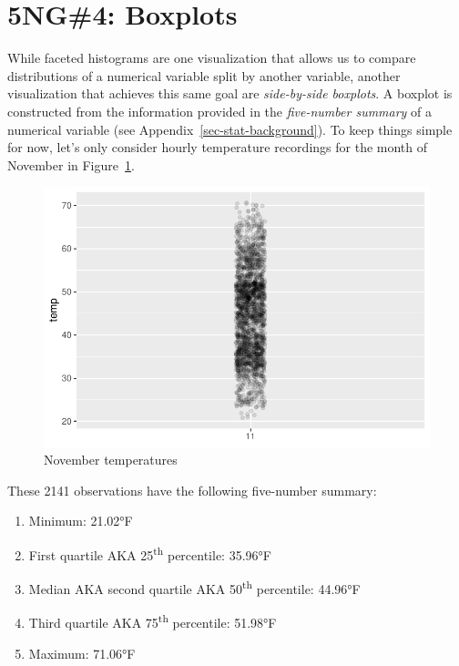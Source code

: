 \documentclass[
  letterpaper,
  DIV=11,
  numbers=noendperiod]{scrreprt}
\providecommand{\tightlist}{%
  \setlength{\itemsep}{0pt}\setlength{\parskip}{0pt}}\usepackage{longtable,booktabs,array}
\theoremstyle{definition}
\theoremstyle{remark}
\begin{document}
\hypertarget{sec-boxplots}{%
\section{5NG\#4: Boxplots}\label{sec-boxplots}}

While faceted histograms are one visualization that allows us to compare
distributions of a numerical variable split by another variable, another
visualization that achieves this same goal are \emph{side-by-side
boxplots}. A boxplot is constructed from the information provided in the
\emph{five-number summary} of a numerical variable (see
Appendix~\ref{sec-stat-background}). To keep things simple for now,
let's only consider hourly temperature recordings for the month of
November in Figure~\ref{fig-nov1}.

\begin{figure}

{\centering \includegraphics{02-visualization_files/figure-pdf/fig-nov1-1.pdf}

}

\caption{\label{fig-nov1}November temperatures}

\end{figure}

These 2141 observations have the following five-number summary:

\begin{enumerate}
\def\labelenumi{\arabic{enumi}.}
\tightlist
\item
  Minimum: 21.02°F
\item
  First quartile AKA 25\textsuperscript{th} percentile: 35.96°F
\item
  Median AKA second quartile AKA 50\textsuperscript{th} percentile:
  44.96°F
\item
  Third quartile AKA 75\textsuperscript{th} percentile: 51.98°F
\item
  Maximum: 71.06°F
\end{enumerate}
\end{document}
